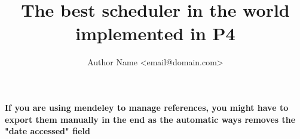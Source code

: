 \documentclass[12pt, openany]{book}
\title{The best scheduler in the world implemented in P4}
\author{Author Name <email@domain.com>}
\begin{document}












% 

\newpage
{}
\textbf{If you are using mendeley to manage references, you might have to export them manually in the end as the automatic ways removes the "date accessed" field}
\printbibliography



%
\end{document}
